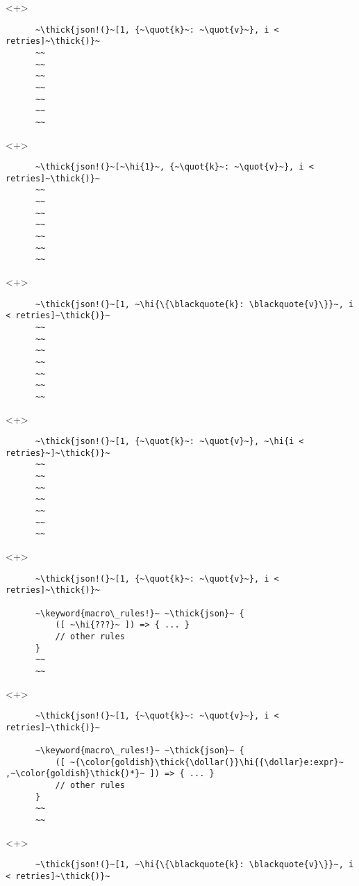 \documentclass[usepdftitle=false,aspectratio=169]{beamer}
\newcommand{\dollar}{\makebox[\widthof{\$}][c]{\$}}
\newcommand{\thick}[1]{\contourlength{0.16pt}\contour[10]{black}{#1}}
\newcommand{\slantbox}[2][.5]
  {%
    \mbox
      {%
        \sbox{\foobox}{#2}%
        \hskip\wd\foobox
        \pdfsave
        \pdfsetmatrix{1 0 #1 1}%
        \llap{\usebox{\foobox}}%
        \pdfrestore
      }%
  }
\newcommand{\backslantbox}[2][.5]
  {%
    \mbox
      {%
        \sbox{\foobox}{#2}%
        \hskip\wd\foobox
        \pdfsave
        \pdfsetmatrix{-1 0 #1 1}%
        \llap{\usebox{\foobox}}%
        \pdfrestore
      }%
  }
\newcommand{\hi}[1]{%
\tikz[baseline=(A.base)]
 \node[highlighting=yellowbg,inner sep=0pt,text depth=0pt] (A) {#1};%
}
\newcommand{\openquote}{\backslantbox[.2]{\hspace{11pt}''\hspace{-11pt}}}
\newcommand{\closequote}{\slantbox[-.2]{\hspace{2pt}''\hspace{-2pt}}}
\newcommand{\blackquote}[1]{\openquote#1\closequote}
\newcommand{\quot}[1]{{\color{redish}\blackquote{#1}}}
\newcommand{\keyword}[1]{\color{greenish}#1}
\begin{document}
\begin{frame}[fragile]
  \begin{onlyenv}<+>
    \begin{verbatim}
      ~\thick{json!(}~[1, {~\quot{k}~: ~\quot{v}~}, i < retries]~\thick{)}~
      ~~
      ~~
      ~~
      ~~
      ~~
      ~~
      ~~
    \end{verbatim}
  \end{onlyenv}
  \begin{onlyenv}<+>
    \begin{verbatim}
      ~\thick{json!(}~[~\hi{1}~, {~\quot{k}~: ~\quot{v}~}, i < retries]~\thick{)}~
      ~~
      ~~
      ~~
      ~~
      ~~
      ~~
      ~~
    \end{verbatim}
  \end{onlyenv}
  \begin{onlyenv}<+>
    \begin{verbatim}
      ~\thick{json!(}~[1, ~\hi{\{\blackquote{k}: \blackquote{v}\}}~, i < retries]~\thick{)}~
      ~~
      ~~
      ~~
      ~~
      ~~
      ~~
      ~~
    \end{verbatim}
  \end{onlyenv}
  \begin{onlyenv}<+>
    \begin{verbatim}
      ~\thick{json!(}~[1, {~\quot{k}~: ~\quot{v}~}, ~\hi{i < retries}~]~\thick{)}~
      ~~
      ~~
      ~~
      ~~
      ~~
      ~~
      ~~
    \end{verbatim}
  \end{onlyenv}
  \begin{onlyenv}<+>
    \begin{verbatim}
      ~\thick{json!(}~[1, {~\quot{k}~: ~\quot{v}~}, i < retries]~\thick{)}~

      ~\keyword{macro\_rules!}~ ~\thick{json}~ {
          ([ ~\hi{???}~ ]) => { ... }
          // other rules
      }
      ~~
      ~~
    \end{verbatim}
  \end{onlyenv}
  \begin{onlyenv}<+>
    \begin{verbatim}
      ~\thick{json!(}~[1, {~\quot{k}~: ~\quot{v}~}, i < retries]~\thick{)}~

      ~\keyword{macro\_rules!}~ ~\thick{json}~ {
          ([ ~{\color{goldish}\thick{\dollar(}}\hi{{\dollar}e:expr}~ ,~\color{goldish}\thick{)*}~ ]) => { ... }
          // other rules
      }
      ~~
      ~~
    \end{verbatim}
  \end{onlyenv}
  \begin{onlyenv}<+>
    \begin{verbatim}
      ~\thick{json!(}~[1, ~\hi{\{\blackquote{k}: \blackquote{v}\}}~, i < retries]~\thick{)}~


\end{verbatim}
\end{onlyenv}
\end{frame}
\end{document}
